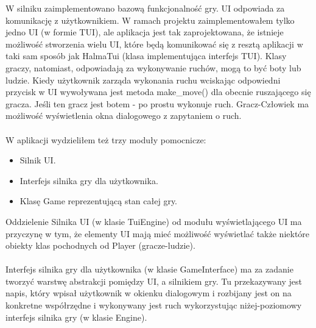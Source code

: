\documentclass[12pt, titlepage]{article}
\begin{document}
\noindent
W silniku zaimplementowano bazową funkcjonalność gry.
UI odpowiada za komunikację z użytkownikiem. W ramach
projektu zaimplementowałem tylko jedno UI (w formie TUI),
ale aplikacja
jest tak zaprojektowana, że istnieje możliwość stworzenia
wielu UI, które będą komunikować się z resztą aplikacji
w taki sam sposób jak HalmaTui (klasa implementująca interfejs TUI).
Klasy graczy, natomiast, odpowiadają za wykonywanie ruchów,
mogą to być boty lub ludzie. Kiedy użytkownik zarząda wykonania
ruchu wciskając odpowiedni przycisk w UI wywoływana jest metoda
make\_move() dla obecnie ruszającego się gracza. Jeśli ten gracz
jest botem - po prostu wykonuje ruch. Gracz-Człowiek ma możliwość
wyświetlenia okna dialogowego z zapytaniem o ruch.
\\~\\
W aplikacji wydzieliłem też trzy moduły pomocnicze:
\begin{itemize}
\item Silnik UI.
\item Interfejs silnika gry dla użytkownika.
\item Klasę Game reprezentującą stan całej gry.
\end{itemize}

\noindent
Oddzielenie Silnika UI (w klasie TuiEngine) od
modułu wyświetlającego UI ma przyczynę w tym, że
elementy UI mają mieć możliwość wyświetlać także
niektóre obiekty klas pochodnych od Player (gracze-ludzie).
\\~\\
Interfejs silnika gry dla użytkownika (w klasie GameInterface)
ma za zadanie tworzyć warstwę abstrakcji pomiędzy UI, a silnikiem
gry. Tu przekazywany jest napis, który wpisał użytkownik w okienku
dialogowym i rozbijany jest on na konkretne współrzędne i
wykonywany jest ruch wykorzystując niżej-poziomowy interfejs
silnika gry (w klasie Engine).
\end{document}
